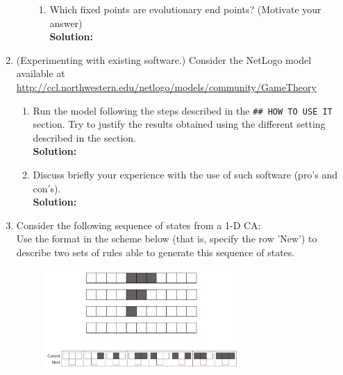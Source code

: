 \documentclass[a4paper]{article}
\begin{document}
\begin{enumerate}
\begin{enumerate}
\begin{enumerate}
				
				
				
				
				\item Which fixed points are evolutionary end points? (Motivate your answer)\\
				\textbf{Solution:}\\
				
				
			\end{enumerate}
	\end{enumerate}	
	
	
	\item (Experimenting with existing software.) Consider the NetLogo model available at\\ \url{http://ccl.northwestern.edu/netlogo/models/community/GameTheory}	
	
	\begin{enumerate}
		\item Run the model following the steps described in the \texttt{\#\# HOW TO USE IT} section. Try to justify the results obtained using the different setting described in the section.\\
		\textbf{Solution:}\\
		
		
		
		
		
		
		\item Discuss briefly your experience with the use of such software (pro's and con's).\\
		\textbf{Solution:}\\
		
		
		
		
	\end{enumerate}		
	
	\item Consider the following sequence of states from a 1-D CA:\\
	Use the format in the scheme below (that is, specify the row 'New') to describe two sets of rules able to generate this sequence of states.
	
		\begin{figure}[H]
	    \centering
  	    \includegraphics[width=0.7\textwidth]{images/task4.PNG}
	    \end{figure}	
	

\end{enumerate}
\end{document}

